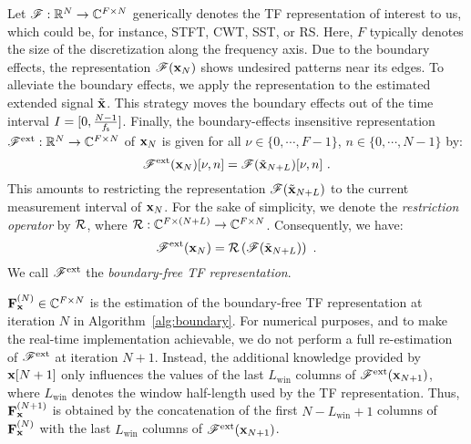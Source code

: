 Let ${\mathscr F}:{\mathbb R}^{N}\to\mathbb C^{F\times N}$ generically denotes the TF representation of interest to us, which could be, for instance, STFT, CWT, SST, or RS. Here, $F$ typically denotes the size of the discretization along the frequency axis. Due to the boundary effects, the representation ${\mathscr F}({\mathbf x}_N)$ shows undesired patterns near its edges. To alleviate the boundary effects, we apply the representation to the estimated extended signal $\tilde{{\mathbf x}}$. This strategy moves the boundary effects out of the time interval $I=[0, \frac{N-1}{f_{\mathsf s}}]$. Finally, the boundary-effects insensitive representation ${\mathscr F}^{\mathrm{ext}}:{\mathbb R}^{N}\to\mathbb C^{F\times N}$ of ${\mathbf x}_N$ is given for all $\nu\in\{0,\cdots,F-1\}$, $n\in\{0,\cdots,N-1\}$ by:
\begin{equation}
\ccF^{\mathrm{ext}}(\bx_N)[\nu,n] = \ccF(\tilde \bx_{N+L})[\nu,n]\ .
\label{eq:restriction}
\end{equation}
This amounts to restricting the representation ${\mathscr F}(\tilde {{\mathbf x}}_{N+L})$ to the current measurement interval of ${\mathbf x}_N$. For the sake of simplicity, we denote the {\em restriction operator} by ${\mathcal R}$, where ${\mathcal R}:\mathbb C^{F\times (N+L)}\to\mathbb C^{F\times N}$. Consequently, we have:
\begin{equation}
\ccF^{\mathrm{ext}}(\bx_N) = \cR\left( \ccF(\tilde \bx_{N+L}) \right) \ .
\label{eq:bound.free.TFR}
\end{equation}
We call ${\mathscr F}^{\mathrm{ext}}$ the {\em boundary-free TF representation}.

${\mathbf F}_{\mathbf x}^{(N)}\in\mathbb C^{F\times N}$ is the estimation of the boundary-free TF representation at iteration $N$ in Algorithm~\ref{alg:boundary}. For numerical purposes, and to make the real-time implementation achievable, we do not perform a full re-estimation of ${\mathscr F}^{\mathrm{ext}}$ at iteration $N+1$. Instead, the additional knowledge provided by ${\mathbf x}[N+1]$ only influences the values of the last $L_{\mathrm{win}}$ columns of ${\mathscr F}^{\mathrm{ext}}({\mathbf x}_{N+1})$, where $L_{\mathrm{win}}$ denotes the window half-length used by the TF representation. Thus, ${\mathbf F}_{\mathbf x}^{(N+1)}$ is obtained by the concatenation of the first $N-L_{\mathrm{win}}+ 1$ columns of ${\mathbf F}_{\mathbf x}^{(N)}$ with the last $L_{\mathrm{win}}$ columns of ${\mathscr F}^{\mathrm{ext}}({\mathbf x}_{N+1})$.